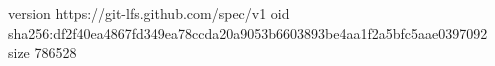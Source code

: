 version https://git-lfs.github.com/spec/v1
oid sha256:df2f40ea4867fd349ea78ccda20a9053b6603893be4aa1f2a5bfc5aae0397092
size 786528
